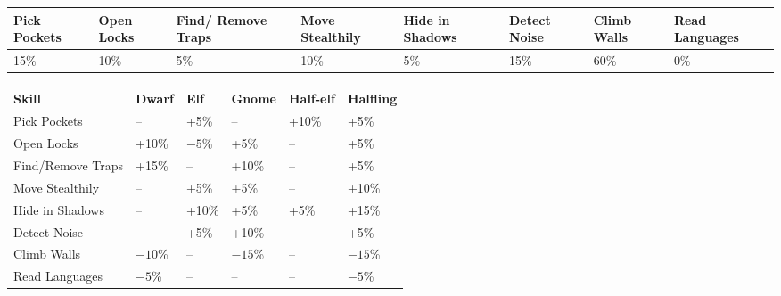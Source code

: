 \noindent
\begin{minipage}{\columnwidth}

\label{thiefbase}
\noindent
\begin{tabular}{|m{}|m{}|m{}|m{}|m{}|m{}|m{}|m{}|}
\hline
Pick Pockets	& Open Locks	& Find/ Remove Traps	& Move Stealthily	& Hide in Shadows	& Detect Noise	& Climb Walls	& Read Languages \\
\hline\hline
\rowcolor[gray]{.9}15\%	& 10\%	& 5\%	& 10\%	& 5\%	& 15\%	& 60\%	& 0\% \\
\hline
\end{tabular}

\end{minipage}

\noindent
\begin{minipage}{\columnwidth}

\label{thiefracemods}
\noindent
\begin{tabular}{|m{}|m{}|m{}|m{}|m{}|m{}|}
\hline
Skill				& Dwarf	& Elf	& Gnome	& Half-elf	& Halfling \\
\hline\hline
\rowcolor[gray]{.9}Pick Pockets		& --		& +5\%	& --		& +10\%	& +5\% \\
Open Locks			& +10\%	& $-5$\%	& +5\%	& --		& +5\% \\
\rowcolor[gray]{.9}Find/Remove Traps	& +15\%	& --		& +10\%	& --		& +5\% \\
Move Stealthily		& --		& +5\%	& +5\%	& --		& +10\% \\
\rowcolor[gray]{.9}Hide in Shadows		& --		& +10\%	& +5\%	& +5\%	& +15\% \\
Detect Noise		& --		& +5\%	& +10\%	& --		& +5\% \\
\rowcolor[gray]{.9}Climb Walls			& $-10$\%	& --		& $-15$\%	& --		& $-15$\% \\
Read Languages		& $-5$\%	& --		& --		& --		& $-5$\% \\
\hline
\end{tabular}

\end{minipage}

